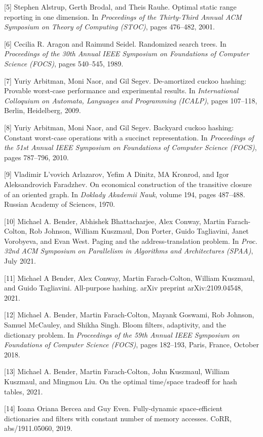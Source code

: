\documentclass[12pt,a4paper]{ctexart}
\theoremstyle{remark}
\begin{document}
[5] Stephen Alstrup, Gerth Brodal, and Theis Rauhe. Optimal static range reporting in one dimension. In \textit{Proceedings of the Thirty-Third Annual ACM Symposium on Theory of Computing (STOC)}, pages 476--482, 2001.

[6] Cecilia R. Aragon and Raimund Seidel. Randomized search trees. In \textit{Proceedings of the 30th Annual IEEE Symposium on Foundations of Computer Science (FOCS)}, pages 540--545, 1989.

[7] Yuriy Arbitman, Moni Naor, and Gil Segev. De-amortized cuckoo hashing: Provable worst-case performance and experimental results. In \textit{International Colloquium on Automata, Languages and Programming (ICALP)}, pages 107--118, Berlin, Heidelberg, 2009.

[8] Yuriy Arbitman, Moni Naor, and Gil Segev. Backyard cuckoo hashing: Constant worst-case operations with a succinct representation. In \textit{Proceedings of the 51st Annual IEEE Symposium on Foundations of Computer Science (FOCS)}, pages 787--796, 2010.

[9] Vladimir L'vovich Arlazarov, Yefim A Dinitz, MA Kronrod, and Igor Aleksandrovich Faradzhev. On economical construction of the transitive closure of an oriented graph. In \textit{Doklady Akademii Nauk}, volume 194, pages 487--488. Russian Academy of Sciences, 1970.

[10] Michael A. Bender, Abhishek Bhattacharjee, Alex Conway, Martin Farach-Colton, Rob Johnson, William Kuszmaul, Don Porter, Guido Tagliavini, Janet Vorobyeva, and Evan West. Paging and the address-translation problem. In \textit{Proc. 32nd ACM Symposium on Parallelism in Algorithms and Architectures (SPAA)}, July 2021.

[11] Michael A Bender, Alex Conway, Martin Farach-Colton, William Kuszmaul, and Guido Tagliavini. All-purpose hashing. arXiv preprint arXiv:2109.04548, 2021.

[12] Michael A. Bender, Martin Farach-Colton, Mayank Goswami, Rob Johnson, Samuel McCauley, and Shikha Singh. Bloom filters, adaptivity, and the dictionary problem. In \textit{Proceedings of the 59th Annual IEEE Symposium on Foundations of Computer Science (FOCS)}, pages 182--193, Paris, France, October 2018.

[13] Michael A. Bender, Martin Farach-Colton, John Kuszmaul, William Kuszmaul, and Mingmou Liu. On the optimal time/space tradeoff for hash tables, 2021.

[14] Ioana Oriana Bercea and Guy Even. Fully-dynamic space-efficient dictionaries and filters with constant number of memory accesses. CoRR, abs/1911.05060, 2019.
\end{document}
